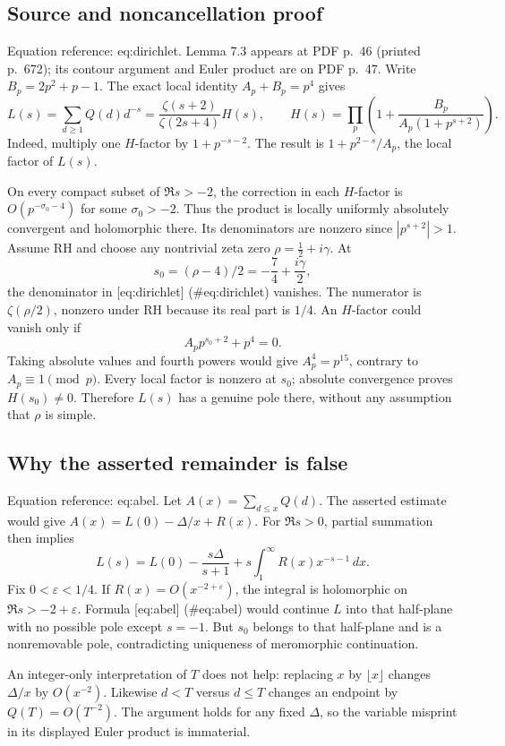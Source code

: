 \documentclass[10pt]{article}
\begin{document}
\subsection*{Source and noncancellation proof}
Equation reference: eq:dirichlet. Lemma 7.3 appears at PDF p. 46 (printed p. 672); its contour argument and Euler product are on PDF p. 47. Write \(B_p=2p^2+p-1\). The exact local identity \(A_p+B_p=p^4\) gives \[
 L(s)=\sum_{d\ge1}Q(d)d^{-s}
     =\frac{\zeta(s+2)}{\zeta(2s+4)}H(s),\qquad
 H(s)=\prod_p\left(1+\frac{B_p}{A_p(1+p^{s+2})}\right).\] Indeed, multiply one \(H\)-factor by \(1+p^{-s-2}\). The result is \(1+p^{2-s}/A_p\), the local factor of \(L(s)\).\par
On every compact subset of \(\Re s>-2\), the correction in each \(H\)-factor is \(O(p^{-\sigma_0-4})\) for some \(\sigma_0>-2\). Thus the product is locally uniformly absolutely convergent and holomorphic there. Its denominators are nonzero since \(|p^{s+2}|>1\). Assume RH and choose any nontrivial zeta zero \(\rho=\frac12+i\gamma\). At \[s_0=(\rho-4)/2=-\frac74+\frac{i\gamma}{2},\] the denominator in [eq:dirichlet] (\#eq:dirichlet) vanishes. The numerator is \(\zeta(\rho/2)\), nonzero under RH because its real part is \(1/4\). An \(H\)-factor could vanish only if \[A_p p^{s_0+2}+p^4=0.\] Taking absolute values and fourth powers would give \(A_p^4=p^{15}\), contrary to \(A_p\equiv1\pmod p\). Every local factor is nonzero at \(s_0\); absolute convergence proves \(H(s_0)\ne0\). Therefore \(L(s)\) has a genuine pole there, without any assumption that \(\rho\) is simple.\par
\subsection*{Why the asserted remainder is false}
Equation reference: eq:abel. Let \(A(x)=\sum_{d\le x}Q(d)\). The asserted estimate would give \(A(x)=L(0)-\Delta/x+R(x)\). For \(\Re s>0\), partial summation then implies \[
 L(s)=L(0)-\frac{s\Delta}{s+1}
             +s\int_1^\infty R(x)x^{-s-1}\,dx.\] Fix \(0<\varepsilon<1/4\). If \(R(x)=O(x^{-2+\varepsilon})\), the integral is holomorphic on \(\Re s>-2+\varepsilon\). Formula [eq:abel] (\#eq:abel) would continue \(L\) into that half-plane with no possible pole except \(s=-1\). But \(s_0\) belongs to that half-plane and is a nonremovable pole, contradicting uniqueness of meromorphic continuation.\par
An integer-only interpretation of \(T\) does not help: replacing \(x\) by \(\lfloor x\rfloor\) changes \(\Delta/x\) by \(O(x^{-2})\). Likewise \(d<T\) versus \(d\le T\) changes an endpoint by \(Q(T)=O(T^{-2})\). The argument holds for any fixed \(\Delta\), so the variable misprint in its displayed Euler product is immaterial.\par
\end{document}
